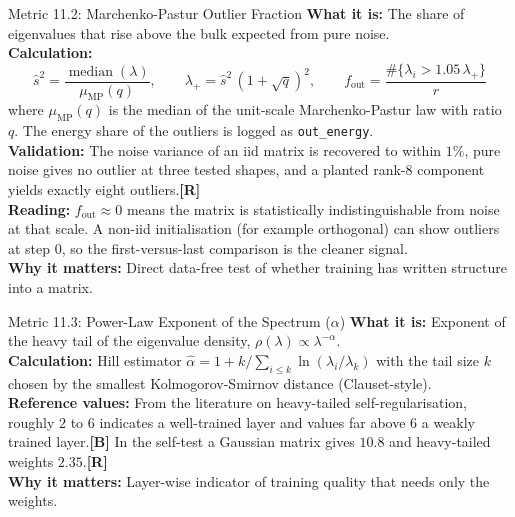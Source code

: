 \documentclass[11pt,a4paper]{article}
\newcommand{\sR}{\textbf{[R]}}
\newcommand{\sB}{\textbf{[B]}}
\begin{document}
\begin{metricbox}{Metric 11.2: Marchenko-Pastur Outlier Fraction}
\textbf{What it is:} The share of eigenvalues that rise above the bulk expected from pure noise.\\
\textbf{Calculation:}
$$\hat s^2 = \frac{\operatorname{median}(\lambda)}{\mu_{\text{MP}}(q)}, \qquad \lambda_+ = \hat s^2\,(1+\sqrt q)^2, \qquad f_{\text{out}} = \frac{\#\{\lambda_i > 1.05\,\lambda_+\}}{r}$$
where $\mu_{\text{MP}}(q)$ is the median of the unit-scale Marchenko-Pastur law with ratio $q$. The energy share of the outliers is logged as \texttt{out\_energy}.\\
\textbf{Validation:} The noise variance of an iid matrix is recovered to within $1\%$, pure noise gives no outlier at three tested shapes, and a planted rank-8 component yields exactly eight outliers.\sR{}\\
\textbf{Reading:} $f_{\text{out}} \approx 0$ means the matrix is statistically indistinguishable from noise at that scale. A non-iid initialisation (for example orthogonal) can show outliers at step 0, so the first-versus-last comparison is the cleaner signal.\\
\textbf{Why it matters:} Direct data-free test of whether training has written structure into a matrix.
\end{metricbox}

\begin{metricbox}{Metric 11.3: Power-Law Exponent of the Spectrum ($\alpha$)}
\textbf{What it is:} Exponent of the heavy tail of the eigenvalue density, $\rho(\lambda) \propto \lambda^{-\alpha}$.\\
\textbf{Calculation:} Hill estimator $\hat\alpha = 1 + k/\sum_{i\le k}\ln(\lambda_i/\lambda_k)$ with the tail size $k$ chosen by the smallest Kolmogorov-Smirnov distance (Clauset-style).\\
\textbf{Reference values:} From the literature on heavy-tailed self-regularisation, roughly $2$ to $6$ indicates a well-trained layer and values far above $6$ a weakly trained layer.\sB{} In the self-test a Gaussian matrix gives $10.8$ and heavy-tailed weights $2.35$.\sR{}\\
\textbf{Why it matters:} Layer-wise indicator of training quality that needs only the weights.
\end{metricbox}
\end{document}
